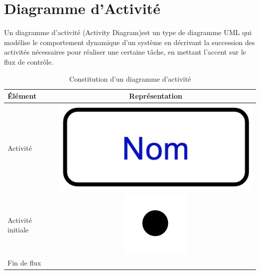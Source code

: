 \section{Diagramme d'Activité}\label{sec:diagramme_activite}
\begin{definition}
Un diagramme d'activité (Activity Diagram)est un type de diagramme UML qui modélise le comportement dynamique d'un système en décrivant la succession des activités nécessaires pour réaliser une certaine tâche, en mettant l'accent sur le flux de contrôle.

\end{definition}


\begin{table}[H]
	\centering
	\caption{Constitution d'un diagramme d'activit\'e}
	\begin{adjustbox}{max width= \textwidth}
		\begin{tabular}{l|c}
			\toprule
			\textbf{\'El\'ement} & \textbf{Repr\'esentation}\\
			\midrule
			Activit\'e & 
			\begin{minipage}{0.2\textwidth}
				\includegraphics[scale=0.4]{./Images/Diagrammes/diagram_activite_elements_activite.png}
			\end{minipage}\\
		\cmidrule(lr){1-2}
			Activit\'e initiale & 
			\begin{minipage}[l]{0.3\textwidth}
				\centering
				\includegraphics[scale=0.2]{./Images/Diagrammes/diagram_activite_elements_activite_initial.png}
			\end{minipage}\\
		\cmidrule(lr){1-2}
		Fin de flux & 

\end{tabular}
\end{adjustbox}
\end{table}
